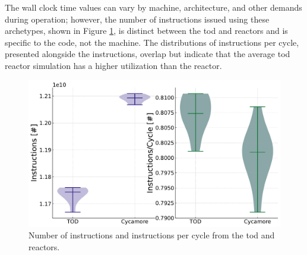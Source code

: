 The wall clock time values can vary by machine, architecture, and other demands during operation; however, the number of instructions issued using these archetypes, shown in Figure \ref{fig:isn_violin}, is distinct between the \gls{tod} and \cycamore reactors and is specific to the code, not the machine. The distributions of instructions per cycle, presented alongside the instructions, overlap but indicate that the average \gls{tod} reactor simulation has a higher utilization than the \cycamore reactor.

\begin{figure}[H]
    \centering
    \includegraphics[width=0.9\linewidth]{images/power_reactor/ins_cyc_both.pdf}
    \caption{Number of instructions and instructions per cycle from the \gls{tod} and \cycamore reactors.}
    \label{fig:isn_violin}
\end{figure}
